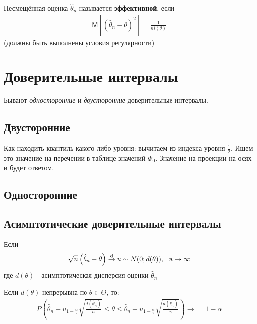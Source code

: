 \documentclass[12pt]{article}
\newcommand{\M}{\mathsf{M}}
\begin{document}
Несмещённая оценка $\widehat{\theta}_{n}$ называется \textbf{эффективной},
если
\begin{eqnarray*}
    \M \left[\left(\widehat{\theta}_{n}-\theta\right)^{2}\right]
    =\frac{1}{ni(\theta)}
\end{eqnarray*}
(должны быть выполнены условия регулярности)

\section{Доверительные интервалы}
Бывают \textit{односторонние} и \textit{двусторонние} доверительные
интервалы.

\subsection{Двусторонние}
\par Как находить квантиль какого либо уровня: вычитаем из индекса
уровня $\frac{1}{2}$. Ищем это значение на перечении в таблице значений
$\Phi_{0}$. Значение на проекции на осях и будет ответом.

\subsection{Односторонние}

\subsection{Асимптотические доверительные интервалы}
Если
\begin{eqnarray*}
    \sqrt{n}\left(\widehat{\theta}_{n}-\theta\right)
    \stackrel{\textmd{d}}{\to }
    u \sim N(0;d(\theta)),\ \ n \to\infty
\end{eqnarray*}
где $d(\theta)$ - асимптотическая дисперсия оценки
$\widehat{\theta}_{n}$

\par Если $d(\theta)$ непрерывна по $\theta \in \Theta$, то:
\begin{eqnarray*}
    P\left(
        \widehat{\theta}_{n}-u_{1-\frac{\alpha}{2}}
        \sqrt{\frac{d(\widehat{\theta}_{n})}{n}}
        \leqslant \theta \leqslant
        \widehat{\theta}_{n}+u_{1-\frac{\alpha}{2}}
        \sqrt{\frac{d(\widehat{\theta}_{n})}{n}}
    \right)
    \to = 1 - \alpha
\end{eqnarray*}
\end{document}
